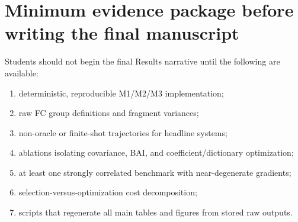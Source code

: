 \documentclass[aps,pra,reprint,superscriptaddress,nofootinbib]{revtex4-2}
\begin{document}
\section*{Minimum evidence package before writing the final manuscript}

Students should not begin the final Results narrative until the following are available:
\begin{enumerate}[leftmargin=2em]
\item deterministic, reproducible M1/M2/M3 implementation;
\item raw FC group definitions and fragment variances;
\item non-oracle or finite-shot trajectories for headline systems;
\item ablations isolating covariance, BAI, and coefficient/dictionary optimization;
\item at least one strongly correlated benchmark with near-degenerate gradients;
\item selection-versus-optimization cost decomposition;
\item scripts that regenerate all main tables and figures from stored raw outputs.
\end{enumerate}
\end{document}
